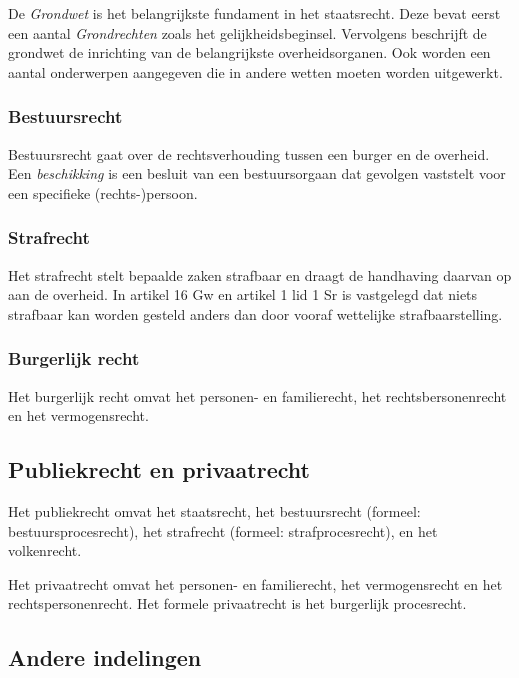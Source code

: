 \documentclass{article}
\begin{document}
De \emph{Grondwet} is het belangrijkste fundament in het staatsrecht. Deze
bevat eerst een aantal \emph{Grondrechten} zoals het gelijkheidsbeginsel.
Vervolgens beschrijft de grondwet de inrichting van de belangrijkste
overheidsorganen. Ook worden een aantal onderwerpen aangegeven die in andere
wetten moeten worden uitgewerkt.

\subsubsection{Bestuursrecht}

Bestuursrecht gaat over de rechtsverhouding tussen een burger en de overheid.
Een \emph{beschikking} is een besluit van een bestuursorgaan dat gevolgen
vaststelt voor een specifieke (rechts-)persoon.

\subsubsection{Strafrecht}

Het strafrecht stelt bepaalde zaken strafbaar en draagt de handhaving daarvan
op aan de overheid. In artikel 16 Gw en artikel 1 lid 1 Sr is vastgelegd dat
niets strafbaar kan worden gesteld anders dan door vooraf wettelijke
strafbaarstelling.

\subsubsection{Burgerlijk recht}

Het burgerlijk recht omvat het personen- en familierecht, het
rechtsbersonenrecht en het vermogensrecht.

\subsection{Publiekrecht en privaatrecht}

Het publiekrecht omvat het staatsrecht, het bestuursrecht (formeel:
bestuursprocesrecht), het strafrecht (formeel: strafprocesrecht), en het
volkenrecht.

Het privaatrecht omvat het personen- en familierecht, het vermogensrecht en het
rechtspersonenrecht. Het formele privaatrecht is het burgerlijk procesrecht.

\subsection{Andere indelingen}
\end{document}
